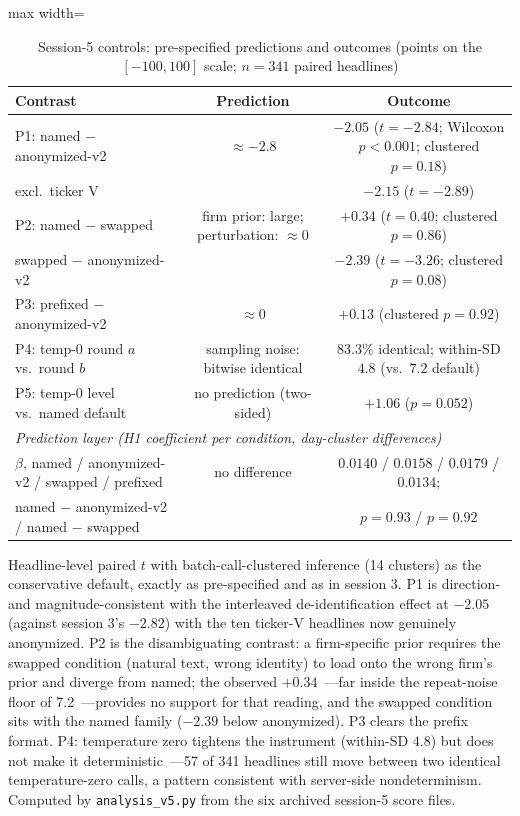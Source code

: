 \begin{table}[htbp]
\centering
\small
\caption{Session-5 controls: pre-specified predictions and outcomes (points on the $[-100,100]$ scale; $n=341$ paired headlines)}
\label{tab:s5}
\begin{adjustbox}{max width=\textwidth}
\begin{tabular}{lcc}
\toprule
Contrast & Prediction & Outcome \\
\midrule
P1: named $-$ anonymized-v2 & $\approx -2.8$ & $-2.05$ ($t=-2.84$; Wilcoxon $p<0.001$; clustered $p=0.18$) \\
\quad excl.\ ticker V & & $-2.15$ ($t=-2.89$) \\
P2: named $-$ swapped & firm prior: large; perturbation: $\approx 0$ & $+0.34$ ($t=0.40$; clustered $p=0.86$) \\
\quad swapped $-$ anonymized-v2 & & $-2.39$ ($t=-3.26$; clustered $p=0.08$) \\
P3: prefixed $-$ anonymized-v2 & $\approx 0$ & $+0.13$ (clustered $p=0.92$) \\
P4: temp-0 round $a$ vs.\ round $b$ & sampling noise: bitwise identical & $83.3\%$ identical; within-SD $4.8$ (vs.\ $7.2$ default) \\
P5: temp-0 level vs.\ named default & no prediction (two-sided) & $+1.06$ ($p=0.052$) \\
\midrule
\multicolumn{3}{l}{\emph{Prediction layer (H1 coefficient per condition, day-cluster differences)}} \\
$\beta$, named / anonymized-v2 / swapped / prefixed & no difference & $0.0140$ / $0.0158$ / $0.0179$ / $0.0134$; \\
named $-$ anonymized-v2 / named $-$ swapped & & $p=0.93$ / $p=0.92$ \\
\bottomrule
\end{tabular}
\end{adjustbox}
\begin{tablenotes}[flushleft]\footnotesize
\item Headline-level paired $t$ with batch-call-clustered inference (14 clusters) as the conservative default, exactly as pre-specified and as in session 3. P1 is direction- and magnitude-consistent with the interleaved de-identification effect at $-2.05$ (against session 3's $-2.82$) with the ten ticker-V headlines now genuinely anonymized. P2 is the disambiguating contrast: a firm-specific prior requires the swapped condition (natural text, wrong identity) to load onto the wrong firm's prior and diverge from named; the observed $+0.34$~---far inside the repeat-noise floor of 7.2~---provides no support for that reading, and the swapped condition sits with the named family ($-2.39$ below anonymized). P3 clears the prefix format. P4: temperature zero tightens the instrument (within-SD $4.8$) but does not make it deterministic~---57 of 341 headlines still move between two identical temperature-zero calls, a pattern consistent with server-side nondeterminism. Computed by \texttt{analysis\_v5.py} from the six archived session-5 score files.
\end{tablenotes}
\end{table}


